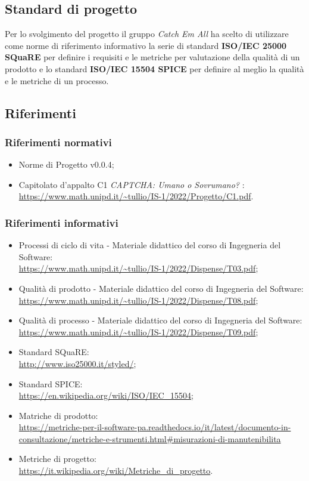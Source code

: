 \subsection{Standard di progetto}
Per lo svolgimento del progetto il gruppo \textit{Catch Em All} ha scelto di utilizzare come norme di riferimento informativo la serie di standard \textbf{ISO/IEC 25000 SQuaRE} per definire i requisiti e le metriche per valutazione della qualità di un prodotto e lo standard \textbf{ISO/IEC 15504 SPICE} per definire al meglio la qualità e le metriche di un processo.

\subsection{Riferimenti}
\subsubsection{Riferimenti normativi}
\begin{itemize}
	\item Norme di Progetto v0.0.4;
	\item Capitolato d'appalto C1 \textit{CAPTCHA: Umano o Sovrumano?} : \\
		\url{https://www.math.unipd.it/~tullio/IS-1/2022/Progetto/C1.pdf}.
\end{itemize}
	
\subsubsection{Riferimenti informativi}\:
\begin{itemize}
	\item Processi di ciclo di vita - Materiale didattico del corso di Ingegneria del Software: \\
		\url{https://www.math.unipd.it/~tullio/IS-1/2022/Dispense/T03.pdf};
	\item Qualità di prodotto - Materiale didattico del corso di Ingegneria del Software: \\
		\url{https://www.math.unipd.it/~tullio/IS-1/2022/Dispense/T08.pdf};
	\item Qualità di processo - Materiale didattico del corso di Ingegneria del Software: \\
		\url{https://www.math.unipd.it/~tullio/IS-1/2022/Dispense/T09.pdf};
	\item Standard SQuaRE: \\
		\url{http://www.iso25000.it/styled/};
	\item Standard SPICE: \\
		\url{https://en.wikipedia.org/wiki/ISO/IEC_15504};
	\item Matriche di prodotto: \\
		\url{https://metriche-per-il-software-pa.readthedocs.io/it/latest/documento-in-consultazione/metriche-e-strumenti.html#misurazioni-di-manutenibilita}
	\item Metriche di progetto: \\
		\url{https://it.wikipedia.org/wiki/Metriche_di_progetto}.
\end{itemize}

